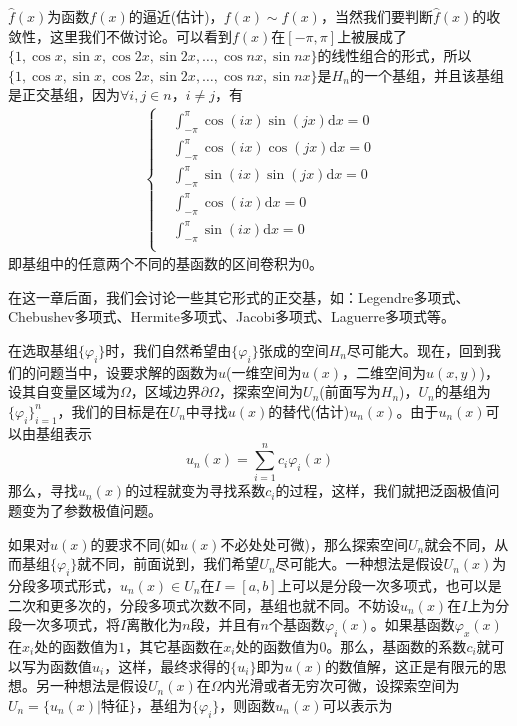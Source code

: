             \par
            $\hat{f}(x)$为函数$f(x)$的逼近(估计)，$f(x) \sim \hat{f}(x)$，当然我们要判断$\hat{f}(x)$的收敛性，这里我们不做讨论。可以看到$f(x)$在$[-\pi ,\pi]$上被展成了$\{1,\cos x,\sin x,\cos 2x,\sin 2x,\dots,\cos nx,\sin nx\}$的线性组合的形式，所以$\{1,\cos x,\sin x,\cos 2x,\sin 2x,\dots,\cos nx,\sin nx\}$是$H_n$的一个基组，并且该基组是正交基组，因为$\forall i,j \in n$，$i\neq j$，有
            \begin{align*}
                \left\{
                    \begin{aligned}
                        &\int_{-\pi }^\pi \cos (ix)\sin(jx) \mathrm{d}x = 0\\
                        &\int_{-\pi }^\pi \cos (ix)\cos(jx) \mathrm{d}x = 0\\
                        &\int_{-\pi }^\pi \sin (ix)\sin(jx) \mathrm{d}x = 0\\
                        &\int_{-\pi }^\pi \cos(ix) \mathrm{d}x = 0\\
                        &\int_{-\pi }^\pi \sin(ix) \mathrm{d}x = 0\\
                    \end{aligned}
                \right.
            \end{align*}
            即基组中的任意两个不同的基函数的区间卷积为$0$。
            \par
            在这一章后面，我们会讨论一些其它形式的正交基，如：Legendre多项式、Chebushev多项式、Hermite多项式、Jacobi多项式、Laguerre多项式等。
            \par
            在选取基组$\{\varphi_i\}$时，我们自然希望由$\{\varphi_i\}$张成的空间$H_n$尽可能大。现在，回到我们的问题当中，设要求解的函数为$u$(一维空间为$u(x)$，二维空间为$u(x,y)$)，设其自变量区域为$\Omega$，区域边界$\partial \Omega$，探索空间为$U_n$(前面写为$H_n$)，$U_n$的基组为$\{\varphi_i\}_{i = 1}^n$，我们的目标是在$U_n$中寻找$u(x)$的替代(估计)$u_n(x)$。由于$u_n(x)$可以由基组表示
            \[
                u_n(x) = \sum_{i = 1}^n c_i \varphi_i(x)
            \]
            那么，寻找$u_n(x)$的过程就变为寻找系数$c_i$的过程，这样，我们就把泛函极值问题变为了参数极值问题。
            \par
            如果对$u(x)$的要求不同(如$u(x)$不必处处可微)，那么探索空间$U_n$就会不同，从而基组$\{\varphi_i\}$就不同，前面说到，我们希望$U_n$尽可能大。一种想法是假设$U_n(x)$为分段多项式形式，$u_n(x)\in U_n$在$I=[a,b]$上可以是分段一次多项式，也可以是二次和更多次的，分段多项式次数不同，基组也就不同。不妨设$u_n(x)$在$I$上为分段一次多项式，将$I$离散化为$n$段，并且有$n$个基函数$\varphi_i(x)$。如果基函数$\varphi_x(x)$在$x_i$处的函数值为$1$，其它基函数在$x_i$处的函数值为$0$。那么，基函数的系数$c_i$就可以写为函数值$u_i$，这样，最终求得的$\{u_i\}$即为$u(x)$的数值解，这正是有限元的思想。另一种想法是假设$U_n(x)$在$\Omega$内光滑或者无穷次可微，设探索空间为$U_n = \{u_n(x)|\text{特征}\}$，基组为$\{\varphi_i\}$，则函数$u_n(x)$可以表示为
